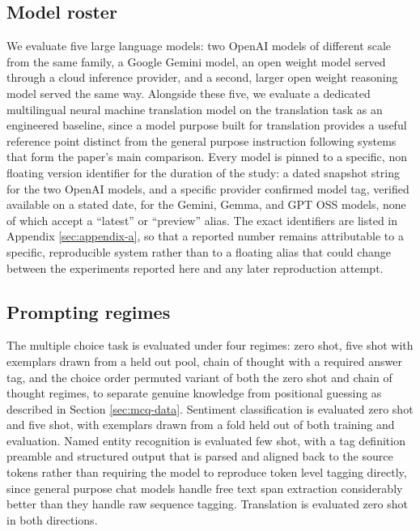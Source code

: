 \documentclass[pdflatex,sn-mathphys-ay]{sn-jnl}
\begin{document}
\subsection{Model roster}

We evaluate five large language models: two OpenAI models of different scale from the same family, a Google Gemini model, an open weight model served through a cloud inference provider, and a second, larger open weight reasoning model served the same way. Alongside these five, we evaluate a dedicated multilingual neural machine translation model on the translation task as an engineered baseline, since a model purpose built for translation provides a useful reference point distinct from the general purpose instruction following systems that form the paper's main comparison. Every model is pinned to a specific, non floating version identifier for the duration of the study: a dated snapshot string for the two OpenAI models, and a specific provider confirmed model tag, verified available on a stated date, for the Gemini, Gemma, and GPT OSS models, none of which accept a ``latest'' or ``preview'' alias. The exact identifiers are listed in Appendix \ref{sec:appendix-a}, so that a reported number remains attributable to a specific, reproducible system rather than to a floating alias that could change between the experiments reported here and any later reproduction attempt.

\subsection{Prompting regimes}

The multiple choice task is evaluated under four regimes: zero shot, five shot with exemplars drawn from a held out pool, chain of thought with a required answer tag, and the choice order permuted variant of both the zero shot and chain of thought regimes, to separate genuine knowledge from positional guessing as described in Section \ref{sec:mcq-data}. Sentiment classification is evaluated zero shot and five shot, with exemplars drawn from a fold held out of both training and evaluation. Named entity recognition is evaluated few shot, with a tag definition preamble and structured output that is parsed and aligned back to the source tokens rather than requiring the model to reproduce token level tagging directly, since general purpose chat models handle free text span extraction considerably better than they handle raw sequence tagging. Translation is evaluated zero shot in both directions.
\end{document}
